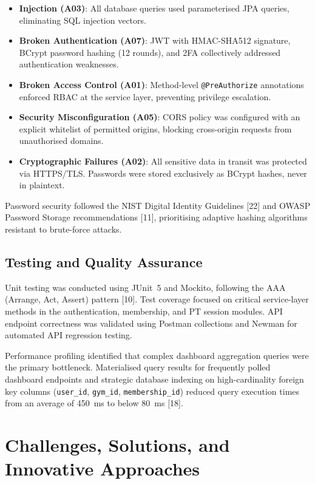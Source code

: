 \documentclass[
  12pt,
  a4paperpaper,
]{report}
\providecommand{\tightlist}{%
  \setlength{\itemsep}{0pt}\setlength{\parskip}{0pt}}
\begin{document}
\begin{itemize}
\tightlist
\item \textbf{Injection (A03)}: All database queries used
  parameterised JPA queries, eliminating SQL injection vectors.
\item \textbf{Broken Authentication (A07)}: JWT with HMAC-SHA512
  signature, BCrypt password hashing (12 rounds), and 2FA
  collectively addressed authentication weaknesses.
\item \textbf{Broken Access Control (A01)}: Method-level
  \texttt{@PreAuthorize} annotations enforced RBAC at the service
  layer, preventing privilege escalation.
\item \textbf{Security Misconfiguration (A05)}: CORS policy was
  configured with an explicit whitelist of permitted origins,
  blocking cross-origin requests from unauthorised domains.
\item \textbf{Cryptographic Failures (A02)}: All sensitive data in
  transit was protected via HTTPS/TLS. Passwords were stored
  exclusively as BCrypt hashes, never in plaintext.
\end{itemize}

Password security followed the NIST Digital Identity Guidelines
{[}22{]} and OWASP Password Storage recommendations
{[}11{]}, prioritising adaptive hashing algorithms
resistant to brute-force attacks.

\subsection{Testing and Quality
Assurance}\label{testing-qas}

Unit testing was conducted using JUnit~5 and Mockito, following the
AAA (Arrange, Act, Assert) pattern {[}10{]}. Test coverage
focused on critical service-layer methods in the authentication,
membership, and PT session modules. API endpoint correctness was
validated using Postman collections and Newman for automated API
regression testing.

Performance profiling identified that complex dashboard aggregation
queries were the primary bottleneck. Materialised query results for
frequently polled dashboard endpoints and strategic database
indexing on high-cardinality foreign key columns (\texttt{user\_id},
\texttt{gym\_id}, \texttt{membership\_id}) reduced query execution
times from an average of 450~ms to below 80~ms {[}18{]}.

\section{Challenges, Solutions, and Innovative
Approaches}\label{challenges-solutions}
\end{document}
